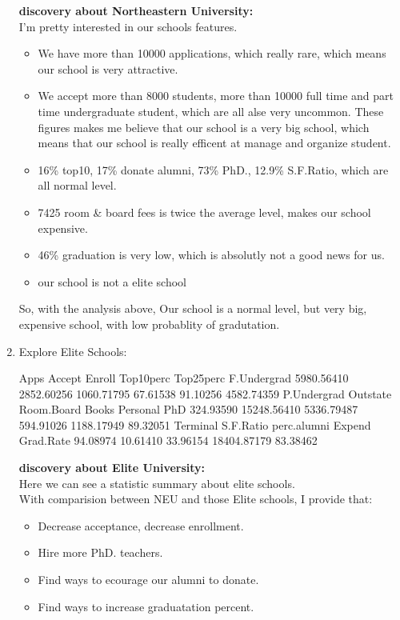 \documentclass[a4paper]{article}
\begin{document}
\begin{enumerate}
{
\colorbox{BurntOrange}{\textbf{discovery about Northeastern University:}}\color{red}\\
I'm pretty interested in our schools features.
\begin{itemize}
\item We have more than 10000 applications, which really rare, which means our school is very attractive.
\item We accept more than 8000 students, more than 10000 full time and part time undergraduate student, which are all alse very uncommon. These figures makes me believe that our school is a very big school, which means that our school is really efficent at manage and organize student.
\item 16\% top10, 17\% donate alumni, 73\% PhD., 12.9\% S.F.Ratio, which are all normal level.
\item 7425 room \& board fees is twice the average level, makes our school expensive.
\item 46\% graduation is very low, which is absolutly not a good news for us.
\item our school is not a elite school
\end{itemize}
So, with the analysis above, Our school is a normal level, but very big, expensive school, with low probablity of gradutation.

}


\item Explore Elite Schools:
\begin{Schunk}
\begin{Soutput}
       Apps      Accept      Enroll   Top10perc   Top25perc F.Undergrad 
 5980.56410  2852.60256  1060.71795    67.61538    91.10256  4582.74359 
P.Undergrad    Outstate  Room.Board       Books    Personal         PhD 
  324.93590 15248.56410  5336.79487   594.91026  1188.17949    89.32051 
   Terminal   S.F.Ratio perc.alumni      Expend   Grad.Rate 
   94.08974    10.61410    33.96154 18404.87179    83.38462 
\end{Soutput}
\end{Schunk}

{
\colorbox{BurntOrange}{\textbf{discovery about Elite University:}}\color{red}\\
Here we can see a statistic summary about elite schools.\\
With comparision between NEU and those Elite schools, I provide that:
\begin{itemize}
\item Decrease acceptance, decrease enrollment.
\item Hire more PhD. teachers.
\item Find ways to ecourage our alumni to donate.
\item Find ways to increase graduatation percent.
\end{itemize}
}

\end{enumerate}
\end{document}
